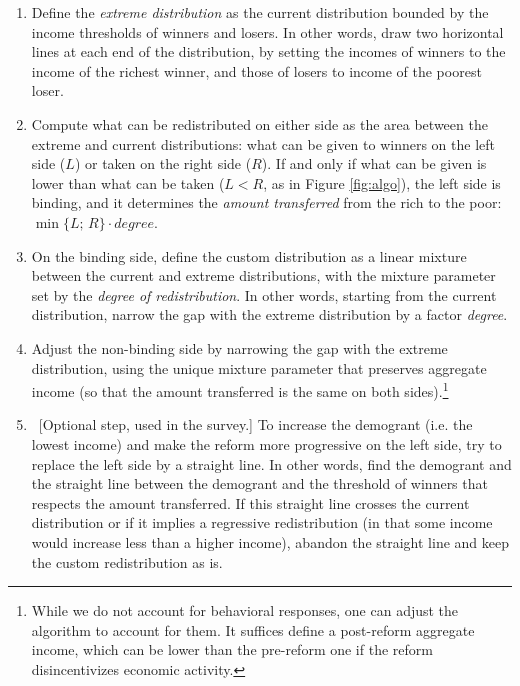 \begin{enumerate}
    \item Define the \textit{extreme distribution} as the current distribution bounded by the income thresholds of winners and losers. In other words, draw two horizontal lines at each end of the distribution, by setting the incomes of winners to the income of the richest winner, and those of losers to income of the poorest loser.
    \item Compute what can be redistributed on either side as the area between the extreme and current distributions: what can be given to winners on the left side ($L$) or taken on the right side ($R$). If and only if what can be given is lower than what can be taken ($L < R$, as in Figure \ref{fig:algo}), the left side is binding, and it determines the \textit{amount transferred} from the rich to the poor: $\min\{L;\,R\} \cdot degree$.
    \item On the binding side, define the custom distribution as a linear mixture between the current and extreme distributions, with the mixture parameter set by the \textit{degree of redistribution}. In other words, starting from the current distribution, narrow the gap with the extreme distribution by a factor \textit{degree}.
    \item Adjust the non-binding side by narrowing the gap with the extreme distribution, using the unique mixture parameter that preserves aggregate income (so that the amount transferred is the same on both sides).\footnote{While we do not account for behavioral responses, one can adjust the algorithm to account for them. It suffices define a post-reform aggregate income, which can be lower than the pre-reform one if the reform disincentivizes economic activity.}
    \item ~[Optional step, used in the survey.] To increase the demogrant (i.e. the lowest income) and make the reform more progressive on the left side, try to replace the left side by a straight line. In other words, find the demogrant and the straight line between the demogrant and the threshold of winners that respects the amount transferred. If this straight line crosses the current distribution or if it implies a regressive redistribution (in that some income would increase less than a higher income), abandon the straight line and keep the custom redistribution as is.
\end{enumerate}

\clearpage

